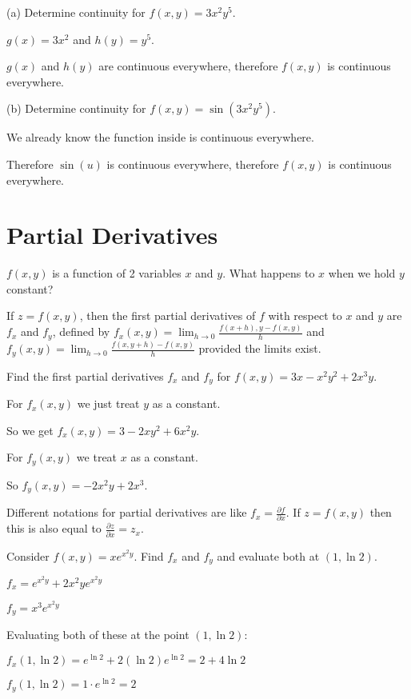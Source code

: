\documentclass[../calc3.tex]{subfiles}
\begin{document}
\begin{example}
    (a) Determine continuity for $f(x,y)=3x^2y^5$.

    $g(x)=3x^2$ and $h(y)=y^5$.

    $g(x)$ and $h(y)$ are continuous everywhere, therefore $f(x,y)$ is continuous everywhere.

    (b) Determine continuity for $f(x,y)=\sin(3x^2y^5)$.

    We already know the function inside is continuous everywhere.

    Therefore $\sin(u)$ is continuous everywhere, therefore $f(x,y)$ is continuous everywhere.
\end{example}

\section{Partial Derivatives}
$f(x,y)$ is a function of 2 variables $x$ and $y$. What happens to $x$ when we hold $y$ constant?

\begin{definition}
    If $z=f(x,y)$, then the first partial derivatives of $f$ with respect to $x$ and $y$ are $f_x$ and $f_y$, defined by $f_x(x,y)=\lim_{h\to 0}\frac{f(x+h),y-f(x,y)}{h}$ and $f_y(x,y)=\lim_{h\to 0}\frac{f(x,y+h)-f(x,y)}{h}$ provided the limits exist.
\end{definition}

\begin{example}
    Find the first partial derivatives $f_x$ and $f_y$ for $f(x,y)=3x-x^2y^2+2x^3y$.

    For $f_x(x,y)$ we just treat $y$ as a constant.

    So we get $f_x(x,y)=3-2xy^2+6x^2y$.

    For $f_y(x,y)$ we treat $x$ as a constant.

    So $f_y(x,y)=-2x^2y+2x^3$.
\end{example}

Different notations for partial derivatives are like $f_x=\frac{\partial f}{\partial x}$. If $z=f(x,y)$ then this is also equal to $\frac{\partial z}{\partial x}=z_x$.

\pagebreak
\begin{example}
    Consider $f(x,y)=xe^{x^2y}$. Find $f_x$ and $f_y$ and evaluate both at $(1,\ln 2)$.

    $f_x=e^{x^2y}+2x^2ye^{x^2y}$

    $f_y=x^3e^{x^2y}$

    Evaluating both of these at the point $(1,\ln 2)$:

    $f_x(1,\ln 2)=e^{\ln 2}+2(\ln 2)e^{\ln 2} = 2+4\ln 2$

    $f_y(1,\ln 2)=1\cdot e^{\ln 2} = 2$
\end{example}
\end{document}
